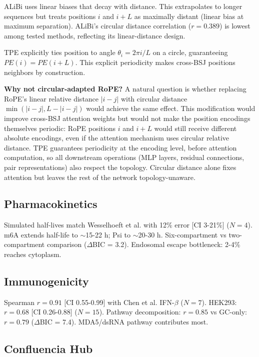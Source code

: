 \documentclass[11pt,a4paper]{article}
\begin{document}
ALiBi uses linear biases that decay with distance. This extrapolates to longer sequences but treats positions $i$ and $i+L$ as maximally distant (linear bias at maximum separation). ALiBi's circular distance correlation ($r=0.389$) is lowest among tested methods, reflecting its linear-distance design.

TPE explicitly ties position to angle $\theta_i = 2\pi i/L$ on a circle, guaranteeing $PE(i) = PE(i+L)$. This explicit periodicity makes cross-BSJ positions neighbors by construction.

\textbf{Why not circular-adapted RoPE?} A natural question is whether replacing RoPE's linear relative distance $|i-j|$ with circular distance $\min(|i-j|, L-|i-j|)$ would achieve the same effect. This modification would improve cross-BSJ attention weights but would not make the position encodings themselves periodic: RoPE positions $i$ and $i+L$ would still receive different absolute encodings, even if the attention mechanism uses circular relative distance. TPE guarantees periodicity at the encoding level, before attention computation, so all downstream operations (MLP layers, residual connections, pair representations) also respect the topology. Circular distance alone fixes attention but leaves the rest of the network topology-unaware.

\subsection{Pharmacokinetics}

Simulated half-lives match Wesselhoeft et al. \citep{wesselhoeft2018} with 12\% error [CI 3-21\%] ($N=4$). m6A extends half-life to $\sim$15-22 h; Psi to $\sim$20-30 h. Six-compartment vs two-compartment comparison ($\Delta$BIC = 3.2). Endosomal escape bottleneck: 2-4\% reaches cytoplasm.

\subsection{Immunogenicity}

Spearman $r=0.91$ [CI 0.55-0.99] with Chen et al. \citep{chen2019} IFN-$\beta$ ($N=7$). HEK293: $r=0.68$ [CI 0.26-0.88] ($N=15$). Pathway decomposition: $r=0.85$ vs GC-only: $r=0.79$ ($\Delta$BIC = 7.4). MDA5/dsRNA pathway contributes most.

\subsection{Confluencia Hub}
\end{document}
